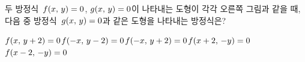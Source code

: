 \noindent\begin{minipage}[t]{0.58\linewidth}\vspace{0pt}\raggedright 두 방정식~$f(x,\mkern3mu y)=0$, $g(x,\mkern3mu y)=0$이 나타내는 도형이 각각 오른쪽 그림과 같을 때, 다음 중 방정식~$g(x,\mkern3mu y)=0$과 같은 도형을 나타내는 방정식은?\end{minipage}\hfill\begin{minipage}[t]{0.4\linewidth}\vspace{0pt}\centering \resizebox{\ifdim\width>\linewidth\linewidth\else\width\fi}{!}{}\end{minipage}\par
\begin{choicesv}{$f(x,\mkern3mu y+2)=0$}{$f(-x,\mkern3mu y-2)=0$}{$f(-x,\mkern3mu y+2)=0$}{$f(x+2,\mkern3mu -y)=0$}{$f(x-2,\mkern3mu -y)=0$}\end{choicesv}
